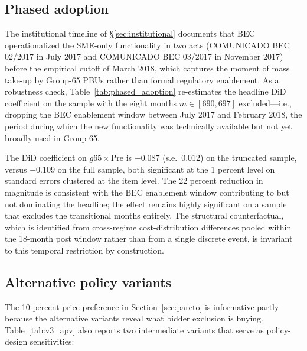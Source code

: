 \subsection{Phased adoption}

The institutional timeline of \S\ref{sec:institutional} documents that BEC operationalized the SME-only functionality in two acts (COMUNICADO BEC 02/2017 in July 2017 and COMUNICADO BEC 03/2017 in November 2017) before the empirical cutoff of March 2018, which captures the moment of mass take-up by Group-65 PBUs rather than formal regulatory enablement. As a robustness check, Table~\ref{tab:phased_adoption} re-estimates the headline DiD coefficient on the sample with the eight months $m \in [690, 697]$ excluded---i.e., dropping the BEC enablement window between July 2017 and February 2018, the period during which the new functionality was technically available but not yet broadly used in Group 65.

The DiD coefficient on $g65 \times \text{Pre}$ is $-0.087$ (s.e.\ $0.012$) on the truncated sample, versus $-0.109$ on the full sample, both significant at the 1 percent level on standard errors clustered at the item level. The 22 percent reduction in magnitude is consistent with the BEC enablement window contributing to but not dominating the headline; the effect remains highly significant on a sample that excludes the transitional months entirely. The structural counterfactual, which is identified from cross-regime cost-distribution differences pooled within the 18-month post window rather than from a single discrete event, is invariant to this temporal restriction by construction.



\subsection{Alternative policy variants}

The 10 percent price preference in Section~\ref{sec:pareto} is informative partly because the alternative variants reveal what bidder exclusion is buying. Table~\ref{tab:v3_apv} also reports two intermediate variants that serve as policy-design sensitivities:

